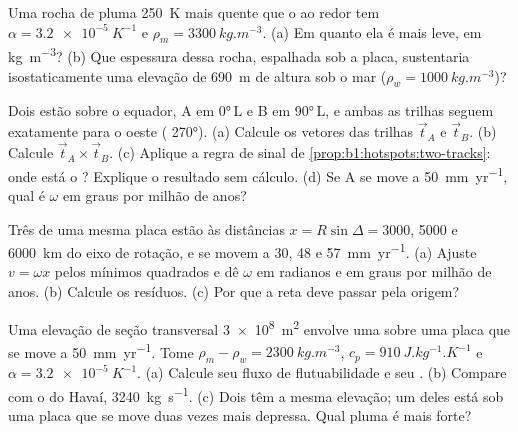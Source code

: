 \begin{exercise}[$\star$]\label{exo:b1:hotspots:4}
Uma rocha de pluma \qty{250}{K} mais quente que o  ao redor tem
$\alpha = \qty{3.2e-5}{K^{-1}}$ e $\rho_m = \qty{3300}{kg.m^{-3}}$. (a) Em quanto ela é mais leve, em \unit{kg.m^{-3}}? (b) Que espessura dessa rocha, espalhada sob a placa, sustentaria isostaticamente uma elevação de \qty{690}{m} de altura sob o mar ($\rho_w = \qty{1000}{kg.m^{-3}}$)?
\end{exercise}

\begin{exercise}[$\star\star$]\label{exo:b1:hotspots:5}
Dois  estão sobre o equador, A em \ang{0}\,L e B em \ang{90}\,L, e ambas as trilhas seguem exatamente para o oeste ( \ang{270}). (a) Calcule os vetores das trilhas $\vec t_A$ e $\vec t_B$. (b) Calcule $\vec t_A\times\vec t_B$. (c) Aplique a regra de sinal de \cref{prop:b1:hotspots:two-tracks}: onde está o ? Explique o resultado sem cálculo. (d) Se A se move a \qty{50}{mm.yr^{-1}}, qual é $\omega$ em graus por milhão de anos?
\end{exercise}

\begin{exercise}[$\star\star$]\label{exo:b1:hotspots:6}
Três  de uma mesma placa estão às distâncias $x = R\sin\Delta = 3000$, 5000
e \qty{6000}{km} do eixo de rotação, e se movem a 30, 48 e
\qty{57}{mm.yr^{-1}}. (a) Ajuste $v = \omega x$ pelos mínimos quadrados e dê $\omega$ em radianos e em graus por milhão de anos. (b) Calcule os resíduos. (c) Por que a reta deve passar pela origem?
\end{exercise}

\begin{exercise}[$\star\star$]\label{exo:b1:hotspots:7}
Uma elevação de seção transversal \qty{3e8}{m^2} envolve uma  sobre uma placa que se move a \qty{50}{mm.yr^{-1}}. Tome $\rho_m - \rho_w = \qty{2300}{kg.m^{-3}}$,
$c_p = \qty{910}{J.kg^{-1}.K^{-1}}$ e $\alpha = \qty{3.2e-5}{K^{-1}}$. (a) Calcule seu fluxo de flutuabilidade e seu . (b) Compare com o do Havaí, \qty{3240}{kg.s^{-1}}. (c) Dois  têm a mesma elevação; um deles está sob uma placa que se move duas vezes mais depressa. Qual pluma é mais forte?
\end{exercise}

